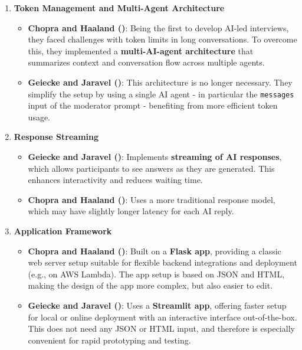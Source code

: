 \documentclass[
  letterpaper,
  DIV=11,
  numbers=noendperiod]{scrartcl}
\providecommand{\tightlist}{%
  \setlength{\itemsep}{0pt}\setlength{\parskip}{0pt}}
\begin{document}
\begin{enumerate}
\def\labelenumi{\arabic{enumi}.}
\tightlist
\item
  \textbf{Token Management and Multi-Agent Architecture}

  \begin{itemize}
  \tightlist
  \item
    \textbf{Chopra and Haaland
    ()}: Being the first to
    develop AI-led interviews, they faced challenges with token limits
    in long conversations. To overcome this, they implemented a
    \textbf{multi-AI-agent architecture} that summarizes context and
    conversation flow across multiple agents.\\
  \item
    \textbf{Geiecke and Jaravel
    ()}: This architecture is
    no longer necessary. They simplify the setup by using a single AI
    agent - in particular the \texttt{messages} input of the moderator
    prompt - benefiting from more efficient token usage.
  \end{itemize}
\item
  \textbf{Response Streaming}

  \begin{itemize}
  \tightlist
  \item
    \textbf{Geiecke and Jaravel
    ()}: Implements
    \textbf{streaming of AI responses}, which allows participants to see
    answers as they are generated. This enhances interactivity and
    reduces waiting time.\\
  \item
    \textbf{Chopra and Haaland
    ()}: Uses a more traditional
    response model, which may have slightly longer latency for each AI
    reply.
  \end{itemize}
\item
  \textbf{Application Framework}

  \begin{itemize}
  \tightlist
  \item
    \textbf{Chopra and Haaland
    ()}: Built on a
    \textbf{Flask app}, providing a classic web server setup suitable
    for flexible backend integrations and deployment (e.g., on AWS
    Lambda). The app setup is based on JSON and HTML, making the design
    of the app more complex, but also easier to edit.
  \item
    \textbf{Geiecke and Jaravel
    ()}: Uses a
    \textbf{Streamlit app}, offering faster setup for local or online
    deployment with an interactive interface out-of-the-box. This does
    not need any JSON or HTML input, and therefore is especially
    convenient for rapid prototyping and testing.
  \end{itemize}
\end{enumerate}
\end{document}

